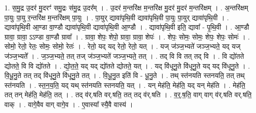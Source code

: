\documentclass[17pt]{extarticle}
\begin{document}
1. स॒मु॒द्र उ॒दर॑ मु॒दरꣳ॑ समु॒द्रः स॑मु॒द्र उ॒दर᳚म् । . उ॒दर॑ म॒न्तरि॑क्ष म॒न्तरि॑क्ष मु॒दर॑ मु॒दर॑ म॒न्तरि॑क्षम् । . अ॒न्तरि॑क्षम् पा॒युः पा॒यु र॒न्तरि॑क्ष म॒न्तरि॑क्षम् पा॒युः । . पा॒युर् द्यावा॑पृथि॒वी द्यावा॑पृथि॒वी पा॒युः पा॒युर् द्यावा॑पृथि॒वी । . द्यावा॑पृथि॒वी आ॒ण्डा वा॒ण्डौ द्यावा॑पृथि॒वी द्यावा॑पृथि॒वी आ॒ण्डौ । . द्यावा॑पृथि॒वी इति॒ द्यावा᳚ - पृ॒थि॒वी । . आ॒ण्डौ ग्रावा॒ ग्रावा॒ ऽऽण्डा वा॒ण्डौ ग्रावा᳚ । . ग्रावा॒ शेपः॒ शेपो॒ ग्रावा॒ ग्रावा॒ शेपः॑ । . शेपः॒ सोमः॒ सोमः॒ शेपः॒ शेपः॒ सोमः॑ । . सोमो॒ रेतो॒ रेतः॒ सोमः॒ सोमो॒ रेतः॑ । . रेतो॒ यद् यद् रेतो॒ रेतो॒ यत् । . यज् ज॑ञ्ज॒भ्यते॑ जञ्ज॒भ्यते॒ यद् यज् ज॑ञ्ज॒भ्यते᳚ । . ज॒ञ्ज॒भ्यते॒ तत् तज् ज॑ञ्ज॒भ्यते॑ जञ्ज॒भ्यते॒ तत् । . तद् वि वि तत् तद् वि । . वि द्यो॑तते द्योतते॒ वि वि द्यो॑तते । . द्यो॒त॒ते॒ यद् यद् द्यो॑तते द्योतते॒ यत् । . यद् वि॑धूनु॒ते वि॑धूनु॒ते यद् यद् वि॑धूनु॒ते । . वि॒धू॒नु॒ते तत् तद् वि॑धूनु॒ते वि॑धूनु॒ते तत् । . वि॒धू॒नु॒त इति॑ वि - धू॒नु॒ते । . तथ् स्त॑नयति स्तनयति॒ तत् तथ् स्त॑नयति । . स्त॒न॒य॒ति॒ यद् यथ् स्त॑नयति स्तनयति॒ यत् । . यन् मेह॑ति॒ मेह॑ति॒ यद् यन् मेह॑ति । . मेह॑ति॒ तत् तन् मेह॑ति॒ मेह॑ति॒ तत् । . तद् व॑र्.षति वर्.षति॒ तत् तद् व॑र्.षति । . व॒र्॒.ष॒ति॒ वाग् वाग् व॑र्.षति वर्.षति॒ वाक् । . वागे॒वैव वाग् वागे॒व । . ए॒वास्या᳚ स्यै॒वै वास्य॑ । \newline
\end{document}
